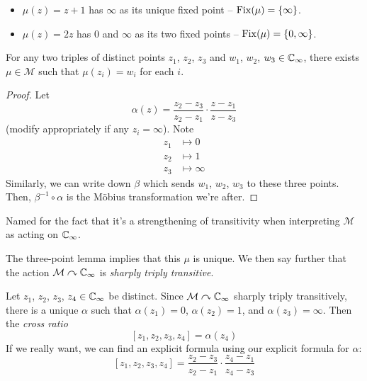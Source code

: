 \documentclass{../../template/note}
\begin{document}
    \begin{example*}
        \begin{itemize}
            \item \(\mu(z) = z+1\) has \(\infty\) as its unique fixed point -- \(\operatorname{Fix}(\mu) = \{\infty\}\).
            \item \(\mu(z) = 2z\) has 0 and \(\infty\) as its two fixed points -- \(\operatorname{Fix}(\mu) = \{0, \infty\}\).
        \end{itemize}
    \end{example*}
    
    \begin{lemma}
        For any two triples of distinct points \(z_1\), \(z_2\), \(z_3\) and \(w_1\), \(w_2\), \(w_3 \in \mathbb C_\infty\), there exists \(\mu \in \mathcal M\) such that \(\mu(z_i) = w_i\) for each \(i\).
    \end{lemma}
    
    \begin{proof}
        Let
        \[
            \alpha(z) = \frac{z_2-z_3}{z_2-z_1} \cdot \frac{z-z_1}{z-z_3}
        \]
        (modify appropriately if any \(z_i = \infty\)). Note
        \begin{align*}
            z_1 &\longmapsto 0 \\
            z_2 &\longmapsto 1 \\
            z_3 &\longmapsto \infty
        \end{align*}
        Similarly, we can write down \(\beta\) which sends \(w_1\), \(w_2\), \(w_3\) to these three points. Then, \(\beta^{-1} \circ \alpha\) is the M\"obius transformation we're after.
        
    \end{proof}
    
    \begin{remark*}
        Named for the fact that it's a strengthening of transitivity when interpreting \(\mathcal M\) as acting on \(\mathbb C_\infty\).
    \end{remark*}
    
    \begin{remark*}
        The three-point lemma implies that this \(\mu\) is unique. We then say further that the action \(\mathcal M \curvearrowright \mathbb C_\infty\) is \emph{sharply triply transitive}.
    \end{remark*}
    
    \begin{definition}
        Let \(z_1\), \(z_2\), \(z_3\), \(z_4 \in \mathbb C_\infty\) be distinct. Since \(\mathcal M \curvearrowright \mathbb C_\infty\) sharply triply transitively, there is a unique \(\alpha\) such that \(\alpha(z_1) = 0\), \(\alpha(z_2) = 1\), and \(\alpha(z_3) = \infty\). Then the \emph{cross ratio}
        \[
            [z_1, z_2, z_3, z_4] = \alpha(z_4)
        \]
        If we really want, we can find an explicit formula using our explicit formula for \(\alpha\):
        \[
            [z_1, z_2, z_3, z_4] = \frac{z_2-z_3}{z_2-z_1} \cdot \frac{z_4-z_1}{z_4-z_3}
        \]
    \end{definition}
    
\end{document}
